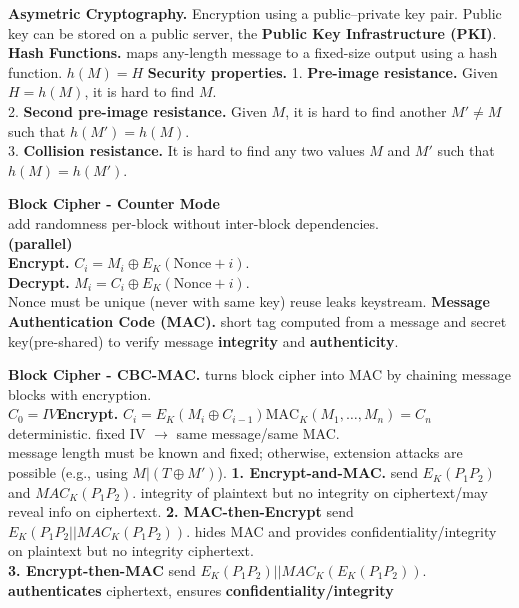 \documentclass[main.tex]{subfiles}
\begin{document}
\begin{minipage}[t]{0.495\textwidth}
	\textbf{Asymetric Cryptography.} Encryption using a public–private key pair. Public key can be stored on a public server, the \textbf{Public Key Infrastructure (PKI)}.\\
	\textbf{Hash Functions.} maps any-length message to a fixed-size output using a hash function. $h(M) = H$
	\textbf{Security properties.}
	1. \textbf{Pre-image resistance.} Given $H = h(M)$, it is hard to find $M$.\\
	2. \textbf{Second pre-image resistance.} Given $M$, it is hard to find another $M' \ne M$ such that $h(M') = h(M)$.\\
	3. \textbf{Collision resistance.} It is hard to find any two values $M$ and $M'$ such that $h(M) = h(M')$.
	\hline
	\begin{minipage}[t]{0.35\textwidth}
		\textbf{Block Cipher - Counter Mode}\\add randomness per-block without inter-block dependencies. \\\textbf{(parallel)}\\
		\textbf{Encrypt.} $C_i = M_i \oplus E_K(\text{Nonce}+i)$.\\
		\textbf{Decrypt.} $M_i = C_i \oplus E_K(\text{Nonce}+i)$.\\
		Nonce must be unique (never with same key) reuse leaks keystream.\hline
		\textbf{Message Authentication Code (MAC).} short tag computed from a message and secret key(pre-shared) to verify message \textbf{integrity} and \textbf{authenticity}.\\
	\end{minipage}
	\begin{minipage}[t]{0.65\textwidth}
		\textbf{Block Cipher - CBC-MAC.} turns block cipher into MAC by chaining message blocks with encryption.\\
		$C_0 = IV $\;\textbf{Encrypt.} $C_i = E_K(M_i \oplus C_{i-1})$\;$\text{MAC}_K(M_1, \ldots, M_n) = C_n$\\
		deterministic. fixed IV $\rightarrow$ same message/same MAC.\\
		\warning message length must be known and fixed; otherwise, extension attacks are possible (e.g., using $M | (T \oplus M')$).
		\hline
		\textbf{1. Encrypt-and-MAC.} send $E_K(P_1P_2)$ and $MAC_K(P_1P_2)$. integrity of plaintext but no integrity on ciphertext/may reveal info on ciphertext. \textbf{2. MAC-then-Encrypt} send $E_K(P_1P_2||MAC_K(P_1P_2))$. hides MAC and provides confidentiality/integrity on plaintext but no integrity ciphertext.\\
		\textbf{3. Encrypt-then-MAC} send $E_K(P_1P_2)||MAC_K(E_K(P_1P_2))$. \textbf{authenticates} ciphertext, ensures \textbf{confidentiality/integrity} \checkmark
	\end{minipage}
\end{minipage}
\end{document}
